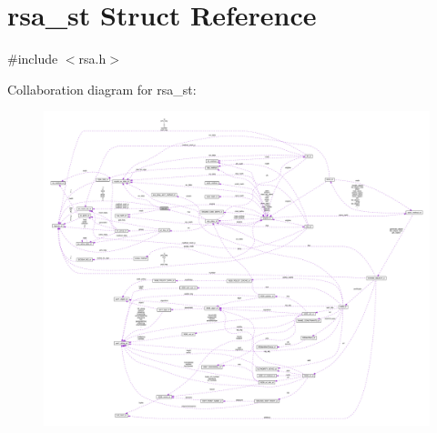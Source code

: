 \hypertarget{structrsa__st}{}\section{rsa\+\_\+st Struct Reference}
\label{structrsa__st}


{\ttfamily \#include $<$rsa.\+h$>$}



Collaboration diagram for rsa\+\_\+st\+:\nopagebreak
\begin{figure}[H]
\begin{center}
\leavevmode
\includegraphics[width=350pt]{structrsa__st__coll__graph}
\end{center}
\end{figure}
